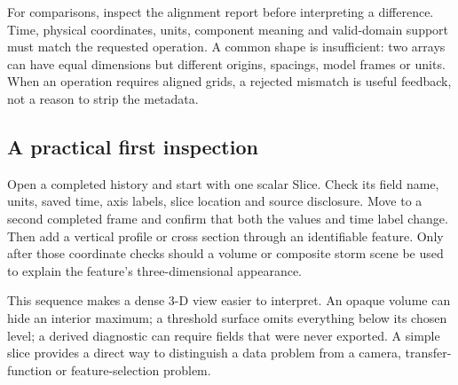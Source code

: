 For comparisons, inspect the alignment report before interpreting a difference.
Time, physical coordinates, units, component meaning and valid-domain support
must match the requested operation. A common shape is insufficient: two arrays
can have equal dimensions but different origins, spacings, model frames or units.
When an operation requires aligned grids, a rejected mismatch is useful feedback,
not a reason to strip the metadata.

\subsection{A practical first inspection}
Open a completed history and start with one scalar Slice. Check its field name,
units, saved time, axis labels, slice location and source disclosure. Move to a
second completed frame and confirm that both the values and time label change.
Then add a vertical profile or cross section through an identifiable feature.
Only after those coordinate checks should a volume or composite storm scene be
used to explain the feature's three-dimensional appearance.

This sequence makes a dense 3-D view easier to interpret. An opaque volume can
hide an interior maximum; a threshold surface omits everything below its chosen
level; a derived diagnostic can require fields that were never exported. A simple
slice provides a direct way to distinguish a data problem from a camera,
transfer-function or feature-selection problem.
